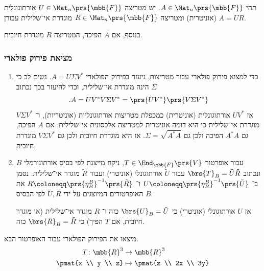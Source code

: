 \documentclass[a4paper,10pt,twoside,openany]{book}
\begin{document}
\begin{theorem}
תהי
$A \in \Mat_n\prs{\mbb{F}}$.
יש מטריצה
$U \in \Mat_n\prs{\mbb{F}}$
אורתוגונלית (אוניטרית) ומטריצה
$R \in \Mat_n\prs{\mbb{F}}$
מוגדרת אי־‏שלילית עבורן
$A = UR$.

בנוסף,
אם
$A$
הפיכה, המטריצה
$R$
מוגדרת חיובית.
\end{theorem}

\subsubsection{מציאת פירוק פולארי}

\begin{enumerate}
\item
כדי למצוא פירוק פולארי עבור מטריצות, ניעזר בפירוק הפולארי
$A = U \Sigma V^*$.
נשים לב כי
$\Sigma$
הינה מוגדרת אי־שלילית, וכדי להיעזר בכך נכתוב
\[\text{.} A = U V^* V \Sigma V^* = \prs{U V^*} \prs{V \Sigma V^*}\]
אז
$U V^*$
אורתוגונלית (אוניטרית) כמכפלת מטריצות אורתוגונליות (אוניטריות), ו־%
$V \Sigma V^*$
מוגדרת אי־שלילית כי היא דומה אוניטרית למטריצה אלכסונית אי־שלילית.
אם
$A$
הפיכה, גם
$A^* A$
הפיכה ולכן גם
$\Sigma = \sqrt{A^* A}$.
אז היא מוגדרת חיובית ולכן גם
$V \Sigma V^*$
מוגדרת חיובית.

\item
עבור אופרטור
$T \in \End_{\mbb{F}}\prs{V}$,
ניקח מייצגת לפי בסיס אורתונורמלי
$B$
ונכתוב
$\brs{T}_B = \tilde{U} \tilde{R}$
עבור
$\tilde{U}$
אורתוגונלי (אוניטרי) ועבור
$\tilde{R}$
מוגדר אי־שלילית. נסמן ב־%
$U \coloneqq \prs{\eta^B_B}^{-1}\prs{\tilde{U}}$
ו־%
$R \coloneqq \prs{\eta^B_B}^{-1}\prs{\tilde{R}}$
את האופרטורים המיוצגים על ידי
$\tilde{U}, \tilde{R}$
לפי הבסיס
$B$.

אז
$U$
אורתוגונלי (אוניטרי) כי
$\brs{U}_B = \tilde{U}$
כזה ו־%
$R$
מוגדר אי־שלילית (או מוגדר חיובית, אם
$T$
הפיך) כי
$\brs{R}_B = \tilde{R}$
כזה.
\end{enumerate}

\begin{exercisechap}
מיצאו את הפירוק הפולארי עבור האופרטור הבא.
\begin{align*}
T \colon \mbb{R}^3 &\to \mbb{R}^3 \\
\pmat{x \\ y \\ z} &\mapsto \pmat{z \\ 2x \\ 3y}
\end{align*}
\end{exercisechap}
\end{document}
